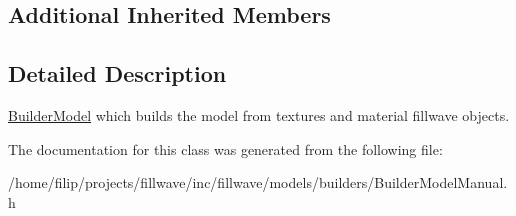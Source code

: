 \subsection*{Additional Inherited Members}


\subsection{Detailed Description}
\hyperlink{classflw_1_1flf_1_1BuilderModel}{Builder\+Model} which builds the model from textures and material fillwave objects. 

The documentation for this class was generated from the following file\+:\begin{DoxyCompactItemize}
\item 
/home/filip/projects/fillwave/inc/fillwave/models/builders/Builder\+Model\+Manual.\+h\end{DoxyCompactItemize}
